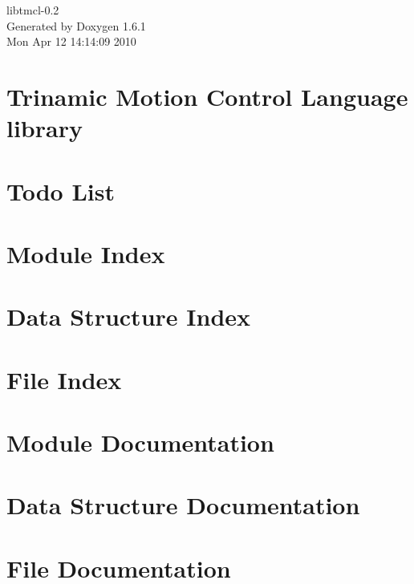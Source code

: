 \documentclass[a4paper]{book}
\begin{document}
\hypersetup{pageanchor=false}
\begin{titlepage}
\vspace*{7cm}
\begin{center}
{\Large libtmcl-\/0.2 }\\
\vspace*{1cm}
{\large Generated by Doxygen 1.6.1}\\
\vspace*{0.5cm}
{\small Mon Apr 12 14:14:09 2010}\\
\end{center}
\end{titlepage}
\clearemptydoublepage
{}
\tableofcontents
\clearemptydoublepage
{}
\hypersetup{pageanchor=true}
\chapter{Trinamic Motion Control Language library}
\label{index}\hypertarget{index}{}
\chapter{Todo List}
\label{todo}
\hypertarget{todo}{}

\chapter{Module Index}

\chapter{Data Structure Index}

\chapter{File Index}

\chapter{Module Documentation}










\chapter{Data Structure Documentation}





\chapter{File Documentation}







\printindex
\end{document}

